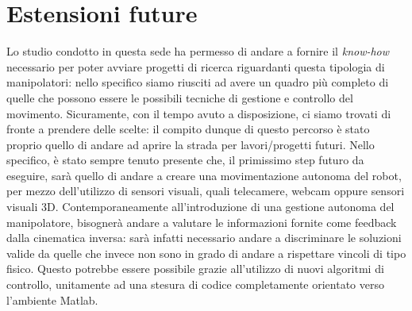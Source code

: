 \documentclass [11 pt, a4 paper, twoside, openright]{book}
\begin{document}
	\chapter{Estensioni future}
	Lo studio condotto in questa sede ha permesso di andare a fornire il \emph{know-how} necessario per poter avviare progetti di ricerca riguardanti questa tipologia di manipolatori: nello specifico siamo riusciti ad avere un quadro più completo di quelle che possono essere le possibili tecniche di gestione e controllo del movimento.
	Sicuramente, con il tempo avuto a disposizione, ci siamo trovati di fronte a prendere delle scelte: il compito dunque di questo percorso è stato proprio quello di andare ad aprire la strada per lavori/progetti futuri. 
	Nello specifico, è stato sempre tenuto presente che, il primissimo step futuro da eseguire, sarà quello di andare a creare una movimentazione autonoma del robot, per mezzo dell'utilizzo di  sensori visuali, quali telecamere, webcam oppure sensori visuali 3D.
	Contemporaneamente all'introduzione di una gestione autonoma del manipolatore, bisognerà andare a valutare le informazioni fornite come feedback dalla cinematica inversa: sarà infatti necessario andare a discriminare le soluzioni valide da quelle che invece non sono in grado di andare a rispettare vincoli di tipo fisico. Questo potrebbe essere possibile grazie all'utilizzo di nuovi algoritmi di controllo, unitamente ad una stesura di codice completamente orientato verso l'ambiente Matlab.
	\backmatter
	\nocite{*}
	\printbibliography
\end{document}
